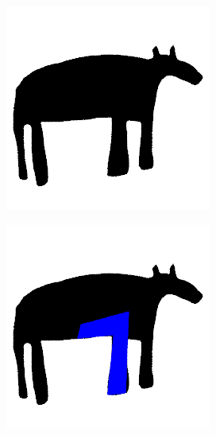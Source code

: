\documentclass[twocolumn]{article}
\begin{document}
\begin{figure}
    \begin{subfigure}{0.23\textwidth}
        \includegraphics[width=0.92\linewidth]{img/horse/target.png}
    \end{subfigure}
    \begin{subfigure}{0.23\textwidth}
        \includegraphics[width=0.92\linewidth]{img/horse/iter_99.png}
    \end{subfigure}


\end{figure}
\end{document}
